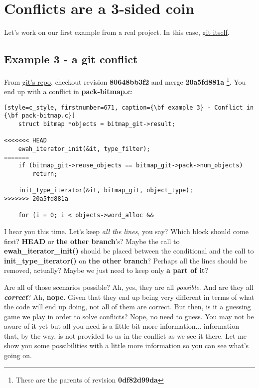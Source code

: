 
\section{Conflicts are a 3-sided coin}

Let's work on our first example from a real project. In this case, \hyperref[git_repo]{git itself}.

\subsection{Example 3 - a git conflict}
\label{example_03}

From \hyperref[git_repo]{git's repo}, checkout revision {\bf 80648bb3f2} and merge {\bf 20a5fd881a} \footnote{These
are the parents of revision {\bf 0df82d99da}}. You end up with a conflict in {\bf pack-bitmap.c}:
\begin{lstlisting}[style=c_style, firstnumber=671, caption={\bf example 3} - Conflict in {\bf pack-bitmap.c}]
	struct bitmap *objects = bitmap_git->result;

<<<<<<< HEAD
	ewah_iterator_init(&it, type_filter);
=======
	if (bitmap_git->reuse_objects == bitmap_git->pack->num_objects)
		return;

	init_type_iterator(&it, bitmap_git, object_type);
>>>>>>> 20a5fd881a

	for (i = 0; i < objects->word_alloc &&
\end{lstlisting}

I hear you this time. Let's keep {\it all the lines}, you say? Which block should come first? {\bf HEAD} or
{\bf the other branch}'s? Maybe the call to {\bf ewah\_iterator\_init()} should be placed between the conditional and
the call to {\bf init\_type\_iterator()} on {\bf the other branch}? Perhaps all the lines should be removed, actually?
Maybe we just need to keep only {\bf a part of it}?

Are all of those scenarios possible? Ah, yes, they are all {\it possible}. And are they all {\it\bf correct}? Ah, {\bf nope}.
Given that they end up being very different in terms of what the code will end up doing, not all of them are correct. But then,
is it a guessing game we play in order to solve conflicts? Nope, no need to guess. You may not be aware of it yet but all you
need is a little bit more information... information that, by the way, is not provided to us in the conflict as we see it there.
Let me show you some possibilities with a little more information so you can see what's going on.

